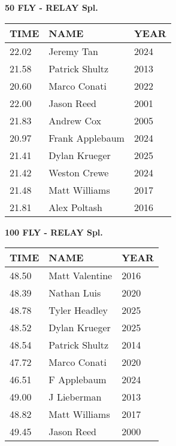 \vspace{0.4cm}

\begin{center}
\begin{minipage}[t]{0.7\textwidth}
\centering
\textbf{50 FLY - RELAY Spl.}\\[0.05cm]
\begin{tabular}{@{}p{1.8cm}p{2.8cm}p{1.2cm}@{}}
\hline
\textbf{TIME} & \textbf{NAME} & \textbf{YEAR} \\
\hline
22.02 & Jeremy Tan & 2024 \\
21.58 & Patrick Shultz & 2013 \\
20.60 & Marco Conati & 2022 \\
22.00 & Jason Reed & 2001 \\
21.83 & Andrew Cox & 2005 \\
20.97 & Frank Applebaum & 2024 \\
21.41 & Dylan Krueger & 2025 \\
21.42 & Weston Crewe & 2024 \\
21.48 & Matt Williams & 2017 \\
21.81 & Alex Poltash & 2016 \\
\hline
\end{tabular}
\end{minipage}
\end{center}

\vspace{0.4cm}

\begin{center}
\begin{minipage}[t]{0.7\textwidth}
\centering
\textbf{100 FLY - RELAY Spl.}\\[0.05cm]
\begin{tabular}{@{}p{1.8cm}p{2.8cm}p{1.2cm}@{}}
\hline
\textbf{TIME} & \textbf{NAME} & \textbf{YEAR} \\
\hline
48.50 & Matt Valentine & 2016 \\
48.39 & Nathan Luis & 2020 \\
48.78 & Tyler Headley & 2025 \\
48.52 & Dylan Krueger & 2025 \\
48.54 & Patrick Shultz & 2014 \\
47.72 & Marco Conati & 2020 \\
46.51 & F Applebaum & 2024 \\
49.00 & J Lieberman & 2013 \\
48.82 & Matt Williams & 2017 \\
49.45 & Jason Reed & 2000 \\
\hline
\end{tabular}
\end{minipage}
\end{center}

